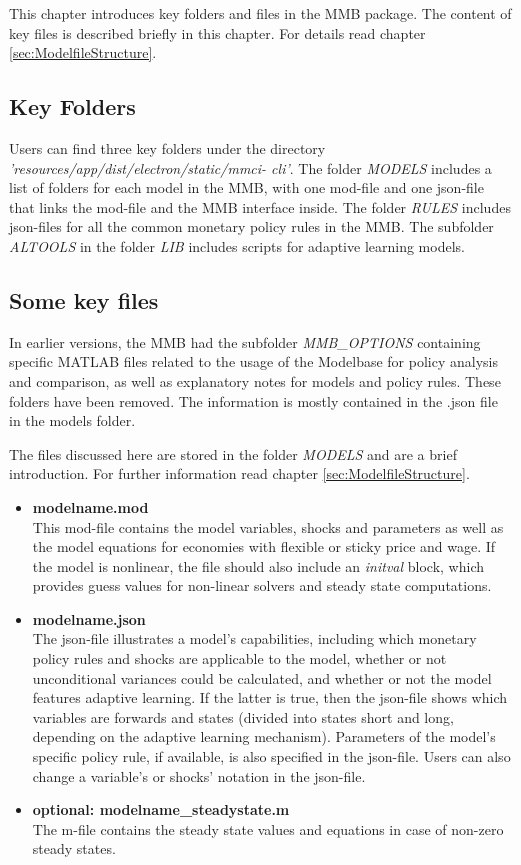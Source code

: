 This chapter introduces key folders and files in the MMB package. The content of key files is described briefly in this chapter. For details read chapter \ref{sec:ModelfileStructure}. 

\subsection*{Key Folders}
 
Users can find three key folders under the directory \textit{’resources/app/dist/electron/static/mmci- cli’}. The folder \textit{MODELS} includes a list of folders for each model in the MMB, with one mod-file and one json-file that links the mod-file and the MMB interface inside. The folder \textit{RULES} includes json-files for all the common monetary policy rules in the MMB. The subfolder \textit{ALTOOLS} in the folder \textit{LIB} includes scripts for adaptive learning models.
\subsection*{Some key files}
In earlier versions, the MMB had the subfolder \textit{MMB\_OPTIONS} containing specific MATLAB files related to the usage of the Modelbase for policy analysis and comparison, as well as explanatory notes for models and policy rules. These folders have been removed. The information is mostly contained in the .json file in the models folder.   

The files discussed here are stored in the folder \textit{MODELS} and are a brief introduction. For further information read chapter \ref{sec:ModelfileStructure}.

\begin{itemize}
\item \textbf{modelname.mod}\\
This mod-file contains the model variables, shocks and parameters as well as the model equations for economies with flexible or sticky price and wage. If the model is nonlinear, the file should also include an \textit{initval} block, which provides guess values for non-linear solvers and steady state computations.
\item \textbf{modelname.json}\\
The json-file illustrates a model’s capabilities, including which monetary policy rules and shocks are applicable to the model, whether or not unconditional variances could be calculated, and whether or not the model features adaptive learning. If the latter is true, then the json-file shows which variables are forwards and states (divided into states short and long, depending on the adaptive learning mechanism). Parameters of the model’s specific policy rule, if available, is also specified in the json-file. Users can also change a variable’s or shocks' notation in the json-file.
\item \textbf{optional: modelname\_steadystate.m}\\
The m-file contains the steady state values and equations in case of non-zero steady states. 
\end{itemize}


